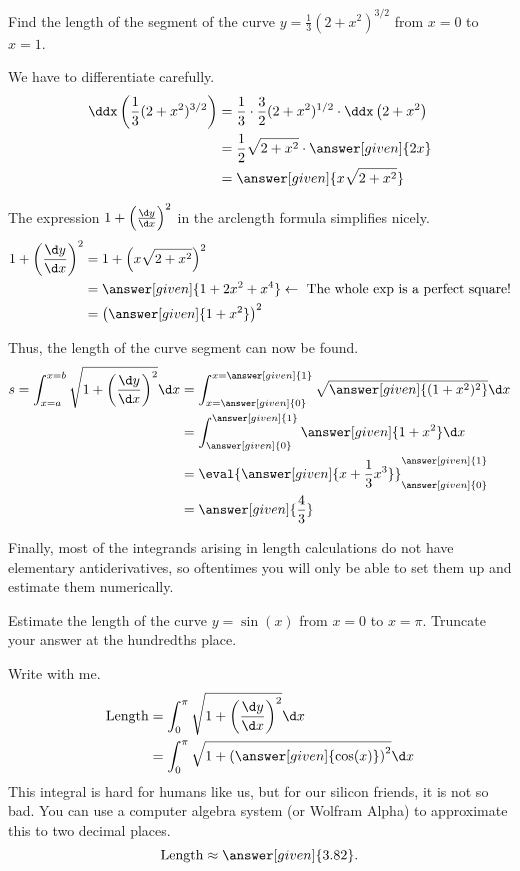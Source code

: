 \documentclass{ximera}
\begin{document}
\begin{example}
Find the length of the segment of the curve $y=\frac{1}{3}(2+x^2)^{3/2}$ from $x=0$ to $x=1$.  

\begin{explanation}
We have to differentiate carefully.
\begin{align*}
\ddx\left(\frac{1}{3}(2+x^2)^{3/2}\right) &= \frac{1}{3} \cdot \frac{3}{2}(2+x^2)^{1/2} \cdot \ddx \left(2+x^2\right) \\
&= \frac{1}{2} \sqrt{2+x^2} \cdot \answer[given]{2x} \\
&= \answer[given]{x\sqrt{2+x^2}}
\end{align*}

The expression $1+\left(\frac{\d y}{\d x}\right)^2$ in the arclength formula simplifies nicely.
\begin{align*}
1+\left(\frac{\d y}{\d x}\right)^2 &= 1+\left(x\sqrt{2+x^2}\right)^2 \\
&=  \answer[given]{1+2x^2+x^4} \leftarrow \textrm{ The whole exp is a perfect square!} \\
&= \left(\answer[given]{1+x^2}\right)^2
\end{align*}

Thus, the length of the curve segment can now be found.
\begin{align*}
s  = \int_{x=a}^{x=b} \sqrt{1+ \left(\frac{\d y}{\d x}\right)^2} \d x &=  \int_{x=\answer[given]{0}}^{x=\answer[given]{1}} \sqrt{\answer[given]{(1+x^2)^2} }\d x \\
&= \int_{\answer[given]{0}}^{\answer[given]{1}} \answer[given]{1+x^2} \d x \\
&= \eval{\answer[given]{x+\frac{1}{3} x^3}}_{\answer[given]{0}}^{\answer[given]{1}}\\
&= \answer[given]{\frac{4}{3}}
\end{align*}
\end{explanation}
\end{example}

Finally, most of the integrands arising in length calculations do not have elementary antiderivatives, so oftentimes you will only be able to set them up and estimate them numerically.

\begin{example}
  Estimate the length of the curve $y = \sin(x)$ from $x=0$ to $x =  \pi$.  Truncate your answer at the hundredths place.
  \begin{explanation}
    Write with me.
    \begin{align*}
      \text{Length} &= \int_0^\pi \sqrt{1+\left( \frac{\d y}{ \d x}\right)^2} \d x\\
      &= \int_0^\pi \sqrt{1+\left(
        \answer[given]{\cos(x)}\right)^2} \d x
    \end{align*}
    This integral is hard for humans like us, but for our silicon
    friends, it is not so bad.  You can use a computer algebra system
    (or Wolfram Alpha) to approximate this to two decimal places.
    \[
    \text{Length} \approx \answer[given]{3.82}.
    \]
  \end{explanation}
\end{example}
\end{document}
